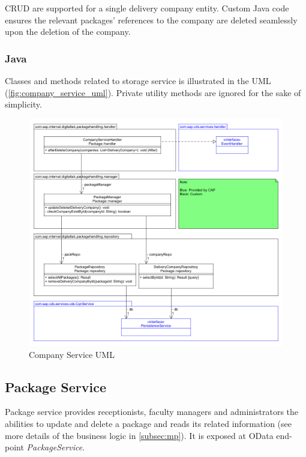 CRUD are supported for a single delivery company entity. Custom Java code ensures the relevant packages' references to the company are deleted seamlessly upon the deletion of the company.

\subsubsection{Java}

Classes and methods related to storage service is illustrated in the UML (\autoref{fig:company_service_uml}). Private utility methods are ignored for the sake of simplicity.

\begin{figure}[H]
    \centering
    \includegraphics[width=1\linewidth]{images/service_class_diagrams/company_service_class_diagram.png}
    \caption{Company Service UML}
    \label{fig:company_service_uml}
\end{figure}


\subsection{Package Service}
\label{subsec:back-mp}

Package service provides receptionists, faculty managers and administrators the abilities to update and delete a package and reads its related information (see more details of the business logic in \autoref{subsec:mp}). It is exposed at OData end-point \textit{PackageService}.


